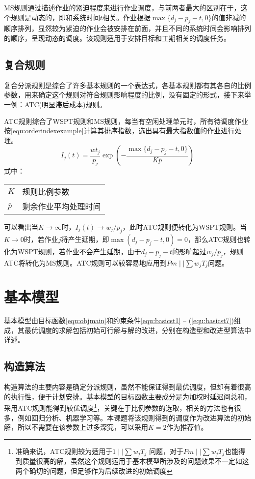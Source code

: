 MS规则通过描述作业的紧迫程度来进行作业调度，与前两者最大的区别在于，这个规则是动态的，即和系统时间$t$相关。作业根据$\max \{d_j - p_j - t , 0\}$的值非减的顺序排列，显然较为紧迫的作业会被安排在前面，并且不同的系统时间会影响排列的顺序，呈现动态的调度。该规则适用于安排目标和工期相关的调度任务。
\subsection{复合规则}
复合分派规则是综合了许多基本规则的一个表达式，各基本规则都有其各自的比例参数，用来确定这个规则对符合规则影响程度的比例，没有固定的形式，接下来举一例：ATC(明显滞后成本)规则。

ATC规则综合了WSPT规则和MS规则，每当有空闲处理单元时，所有待调度作业按\eqref{equ:orderindexexample}计算其排序指数，选出具有最大指数值的作业进行处理。
\begin{equation}
I_j(t) = \frac{wt_j}{p_j}\exp\left(-\frac{\max\{d_j - p_j - t, 0\}}{K\bar p}\right) \label{equ:orderindexexample}
\end{equation}
式中：

\begin{tabular}{ll}
$K$ & 规则比例参数\\
$\bar p$ &剩余作业平均处理时间
\end{tabular}

可以看出当$K \to \infty$时，$I_j(t) \to w_j/p_j$，此时ATC规则便转化为WSPT规则。当$K \to 0$时，若作业$j$将产生延期，即$\max(d_j - p_j -t , 0 ) = 0$，那么ATC规则也转化为WSPT规则，若作业不会产生延期，由于$d_j - p_j - t$的影响超过$w_j/p_j$，规则ATC将转化为MS规则。ATC规则可以较容易地应用到$Pm\mid\mid \sum w_jT_j$问题。

\section{基本模型}
基本模型由目标函数\eqref{equ:objmain}和约束条件\eqref{equ:basicst1} -- (\ref{equ:basicst7})组成，其最优调度的求解包括初始可行解与解的改进，分别在构造型和改进型算法中详述。
\subsection{构造算法}
构造算法的主要内容是确定分派规则，虽然不能保证得到最优调度，但却有着很高的执行性，便于计划安排。基本模型的目标函数主要成分是为加权时延迟间总和，采用ATC规则能得到较优调度\footnote{准确来说，ATC规则较为适用于$1\mid\mid \sum w_jT_j$ 问题，对于$Pm\mid\mid \sum w_jT_j$也能得到质量很高的解，虽然这个规则运用于基本模型所涉及的问题效果不一定如这两个确切的问题，但足够作为后续改进的初始调度}，关键在于比例参数的选取，相关的方法也有很多，例如回归分析、机器学习等。本课题将该规则得到的调度作为改进算法的初始解，所以不需要在该参数上过多深究，可以采用$K = 2$作为推荐值\cite{bilge2007tabu}。

